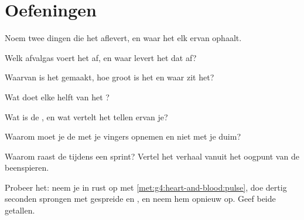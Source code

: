 \section{Oefeningen}

\begin{exercise}[$\star$]\label{exo:g4:heart-and-blood:1}
Noem twee dingen die het  aflevert, en waar het elk ervan ophaalt.
\end{exercise}

\begin{exercise}[$\star$]\label{exo:g4:heart-and-blood:2}
Welk afvalgas voert het  af, en waar levert het dat af?
\end{exercise}

\begin{exercise}[$\star$]\label{exo:g4:heart-and-blood:3}
Waarvan is het  gemaakt, hoe groot is het en waar zit het?
\end{exercise}

\begin{exercise}[$\star$]\label{exo:g4:heart-and-blood:4}
Wat doet elke helft van het ?
\end{exercise}

\begin{exercise}[$\star$]\label{exo:g4:heart-and-blood:5}
Wat is de , en wat vertelt het tellen ervan je?
\end{exercise}

\begin{exercise}[$\star$]\label{exo:g4:heart-and-blood:6}
Waarom moet je de  met je vingers opnemen en niet met je duim?
\end{exercise}

\begin{exercise}[$\star$]\label{exo:g4:heart-and-blood:7}
Waarom raast de  tijdens een sprint? Vertel het verhaal vanuit
het oogpunt van de beenspieren.
\end{exercise}

\begin{exercise}[$\star$]\label{exo:g4:heart-and-blood:8}
Probeer het: neem je  in rust op met
\cref{met:g4:heart-and-blood:pulse}, doe dertig seconden sprongen met
gespreide  en , en neem hem opnieuw op. Geef beide getallen.
\end{exercise}

